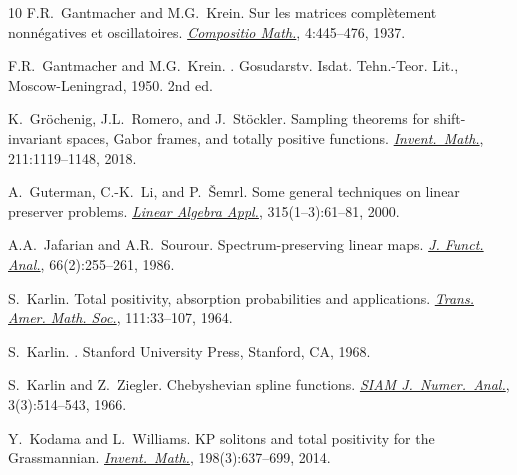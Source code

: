\documentclass[11pt,reqno]{amsart}
\theoremstyle{plain}
\theoremstyle{definition}
\numberwithin{equation}{section}
\begin{document}
\begin{thebibliography}{10}
		F.R.~Gantmacher and M.G.~Krein.
		\newblock Sur les matrices compl\`etement nonn\'egatives et oscillatoires.
		\newblock \href{http://www.numdam.org/item?id=CM_1937__4__445_0}%
		{\em Compositio Math.}, 4:445--476, 1937.
		
		F.R.~Gantmacher and M.G.~Krein.
		.
		\newblock Gosudarstv. Isdat. Tehn.-Teor. Lit., Moscow-Leningrad, 1950.
		\newblock 2nd ed.
		
		K.~Gr\"{o}chenig, J.L.~Romero, and J.~St\"{o}ckler.
		\newblock Sampling theorems for shift-invariant spaces, {G}abor frames, and totally positive functions.
		\newblock \href{http://dx.doi.org/10.1007/s00222-017-0760-2}{\em Invent.\ Math.}, 211:1119--1148, 2018.
		
		A.~Guterman, C.-K.~Li, and P.~\v{S}emrl.
		\newblock Some general techniques on linear preserver problems.
		\newblock \href{https://doi.org/10.1016/S0024-3795(00)00119-1}{\em Linear Algebra Appl.}, 315(1--3):61--81, 2000.
		
		A.A.~Jafarian and A.R.~Sourour.
		\newblock Spectrum-preserving linear maps.
		\newblock \href{https://www.sciencedirect.com/science/article/pii/002212368690073X}{\em J. Funct. Anal.}, 66(2):255--261, 1986.
		
		S.~Karlin.
		\newblock Total positivity, absorption probabilities and applications.
		\newblock \href{https://doi.org/10.2307/1993667}{\em Trans. Amer. Math. Soc.}, 111:33--107, 1964.
		
		S.~Karlin.
		.
		\newblock Stanford University Press, Stanford, CA, 1968.
		
		S.~Karlin and Z.~Ziegler.
		\newblock Chebyshevian spline functions.
		\newblock \href{http://dx.doi.org/10.1137/0703044}{\em SIAM J.\ Numer.\ Anal.}, 3(3):514--543, 1966.
		
		
		Y.~Kodama and L.~Williams.
		\newblock K{P} solitons and total positivity for the {G}rassmannian.
		\newblock \href{http://dx.doi.org/10.1007/s00222-014-0506-3}
		{\em Invent.\ Math.}, 198(3):637--699, 2014.
		

\end{thebibliography}
\end{document}
